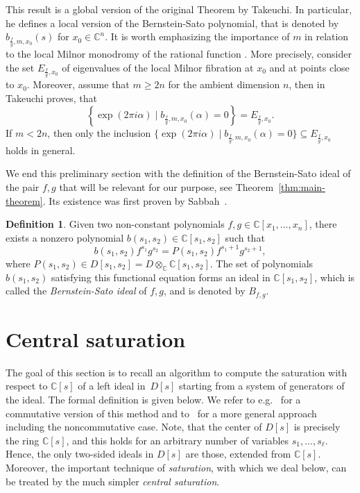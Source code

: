 \documentclass[a4paper,12pt]{amsart}
\theoremstyle{plain}
\theoremstyle{definition}
\newtheorem{defi}[theorem]{Definition}
\theoremstyle{remark}
\def\CC{\mathbb{C}}
\begin{document}
This result is a global version of the original Theorem by Takeuchi. In particular, he defines a local version of the
Bernstein-Sato polynomial, that is denoted by $b_{\frac{f}{g},m, x_0}^{}(s)$ for $x_0 \in \CC^n$. It is worth emphasizing the importance of $m$ in relation to the local Milnor monodromy of the rational function \cite{MR1647824,MR1734347}.
More precisely, consider the set $E_{\frac{f}{g}, x_0}$ of eigenvalues of the local Milnor fibration at $x_0$ and at points close to $x_0$. 
Moreover, assume that 
$m \geq 2n$ for the ambient dimension $n$, then in \cite[Theorem 1.4]{Tak23} Takeuchi proves, that 
\begin{equation}\label{eq:thm-eigen}
\left\{ \exp(2 \pi i \alpha) \mid b_{\frac{f}{g},m, x_0}(\alpha)=0 \right\} = E_{\frac{f}{g},x_0}.
\end{equation}
If $m < 2n$, then only the inclusion $\{\exp(2 \pi i \alpha) \mid b_{\frac{f}{g},m, x_0}(\alpha)=0\} \subseteq E_{\frac{f}{g}, x_0}$ holds in general.

We end this preliminary section with the definition of the Bernstein-Sato ideal of the pair $f,g$
that will be relevant for our purpose, see Theorem~\ref{thm:main-theorem}.
Its existence was first proven by Sabbah~\cite{Sab87}.

\begin{defi}\label{def:BS-ideal}
Given two non-constant polynomials $f,g \in \CC[x_1,\ldots,x_n]$, there exists a nonzero polynomial $b(s_1,s_2) \in \CC[s_1,s_2]$
such that
\[
b(s_1,s_2) f^{s_1} g^{s_2} = P(s_1,s_2) f^{s_1+1} g^{s_2+1},
\]
where $P(s_1,s_2) \in D[s_1,s_2] = D \otimes_\CC \CC[s_1,s_2]$.
The set of polynomials $b(s_1,s_2)$ satisfying this functional equation forms an ideal in $\CC[s_1,s_2]$, which is called the \emph{Bernstein-Sato ideal} of $f,g$, and is denoted by $B_{f,g}$.
\end{defi}


\section{Central saturation}\label{sec:sat}

The goal of this section is to recall an algorithm to compute the saturation with respect to $\CC[s]$ of a left ideal in~$D[s]$ starting from a system of generators of the ideal. The formal definition is given below.
We refer to e.g.~\cite[\S 8.7]{BW93} for a commutative version of this
method and to~\cite{HL21} for a more general approach including the noncommutative case.
Note, that the center of $D[s]$ is precisely the ring $\CC[s]$, and this holds for an arbitrary number of variables $s_1, \ldots, s_{\ell}$. Hence, the only two-sided ideals in $D[s]$ are those, extended from $\CC[s]$. Moreover, the important technique of \emph{saturation}, with which we deal below, can be treated by the much simpler \emph{central saturation}. %
\end{document}

